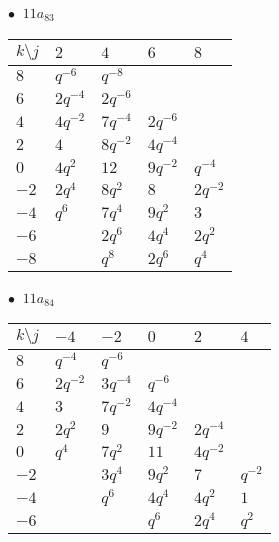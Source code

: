 \begin{minipage}{\linewidth}
$\bullet\ $ $11a_{83}$ \vspace{0.5em} \\
\begin{tabular}{l|llll}
$k \setminus j$ & $2$ & $4$ & $6$ & $8$ \\
\hline
$8$ & $q^{-6}$ & $q^{-8}$ &  &  \\
$6$ & $2q^{-4}$ & $2q^{-6}$ &  &  \\
$4$ & $4q^{-2}$ & $7q^{-4}$ & $2q^{-6}$ &  \\
$2$ & $4$ & $8q^{-2}$ & $4q^{-4}$ &  \\
$0$ & $4q^{2}$ & $12$ & $9q^{-2}$ & $q^{-4}$ \\
$-2$ & $2q^{4}$ & $8q^{2}$ & $8$ & $2q^{-2}$ \\
$-4$ & $q^{6}$ & $7q^{4}$ & $9q^{2}$ & $3$ \\
$-6$ &  & $2q^{6}$ & $4q^{4}$ & $2q^{2}$ \\
$-8$ &  & $q^{8}$ & $2q^{6}$ & $q^{4}$ \\
\end{tabular}
\vspace{2em}
\end{minipage}
%
\begin{minipage}{\linewidth}
$\bullet\ $ $11a_{84}$ \vspace{0.5em} \\
\begin{tabular}{l|lllll}
$k \setminus j$ & $-4$ & $-2$ & $0$ & $2$ & $4$ \\
\hline
$8$ & $q^{-4}$ & $q^{-6}$ &  &  &  \\
$6$ & $2q^{-2}$ & $3q^{-4}$ & $q^{-6}$ &  &  \\
$4$ & $3$ & $7q^{-2}$ & $4q^{-4}$ &  &  \\
$2$ & $2q^{2}$ & $9$ & $9q^{-2}$ & $2q^{-4}$ &  \\
$0$ & $q^{4}$ & $7q^{2}$ & $11$ & $4q^{-2}$ &  \\
$-2$ &  & $3q^{4}$ & $9q^{2}$ & $7$ & $q^{-2}$ \\
$-4$ &  & $q^{6}$ & $4q^{4}$ & $4q^{2}$ & $1$ \\
$-6$ &  &  & $q^{6}$ & $2q^{4}$ & $q^{2}$ \\
\end{tabular}
\vspace{2em}
\end{minipage}
%
